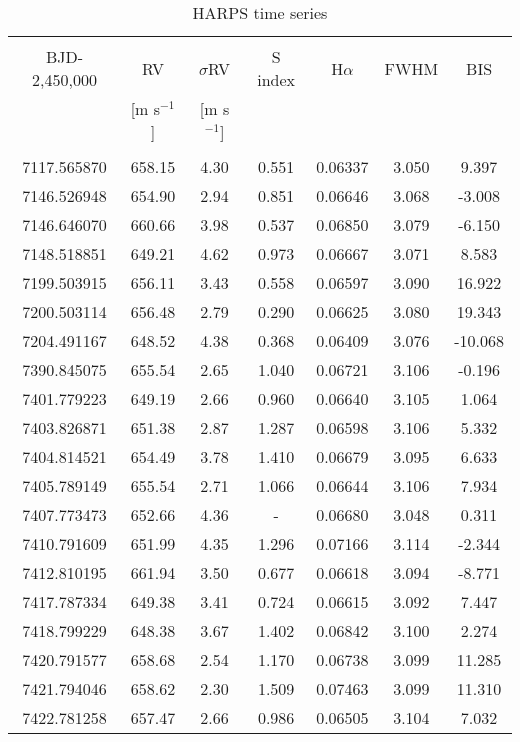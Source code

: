 \begin{table}
\small
\renewcommand{\arraystretch}{0.7}
\centering
\caption[]{HARPS time series}
\label{k218table:data}
\begin{tabular}{ccccccc}
\hline \\ [-1ex]
BJD-2,450,000 & RV & $\sigma$RV & S index & H$\alpha$ & FWHM & BIS \\
& [m s$^{-1}$] & [m s$^{-1}$] &  &  & & \\
\hline \\ [-1ex]
7117.565870 & 658.15 & 4.30 & 0.551 & 0.06337 & 3.050 & 9.397 \\
7146.526948 & 654.90 & 2.94 & 0.851 & 0.06646 & 3.068 & -3.008 \\
7146.646070 & 660.66 & 3.98 & 0.537 & 0.06850 & 3.079 & -6.150 \\
7148.518851 & 649.21 & 4.62 & 0.973 & 0.06667 & 3.071 & 8.583 \\
7199.503915 & 656.11 & 3.43 & 0.558 & 0.06597 & 3.090 & 16.922 \\
7200.503114 & 656.48 & 2.79 & 0.290 & 0.06625 & 3.080 & 19.343 \\
7204.491167 & 648.52 & 4.38 & 0.368 & 0.06409 & 3.076 & -10.068 \\
7390.845075 & 655.54 & 2.65 & 1.040 & 0.06721 & 3.106 & -0.196 \\
7401.779223 & 649.19 & 2.66 & 0.960 & 0.06640 & 3.105 & 1.064 \\
7403.826871 & 651.38 & 2.87 & 1.287 & 0.06598 & 3.106 & 5.332 \\
7404.814521 & 654.49 & 3.78 & 1.410 & 0.06679 & 3.095 & 6.633 \\
7405.789149 & 655.54 & 2.71 & 1.066 & 0.06644 & 3.106 & 7.934 \\
7407.773473 & 652.66 & 4.36 & - & 0.06680 & 3.048 & 0.311 \\
7410.791609 & 651.99 & 4.35 & 1.296 & 0.07166 & 3.114 & -2.344 \\
7412.810195 & 661.94 & 3.50 & 0.677 & 0.06618 & 3.094 & -8.771 \\
7417.787334 & 649.38 & 3.41 & 0.724 & 0.06615 & 3.092 & 7.447 \\
7418.799229 & 648.38 & 3.67 & 1.402 & 0.06842 & 3.100 & 2.274 \\
7420.791577 & 658.68 & 2.54 & 1.170 & 0.06738 & 3.099 & 11.285 \\
7421.794046 & 658.62 & 2.30 & 1.509 & 0.07463 & 3.099 & 11.310 \\
7422.781258 & 657.47 & 2.66 & 0.986 & 0.06505 & 3.104 & 7.032 \\

\end{tabular}
\end{table}
